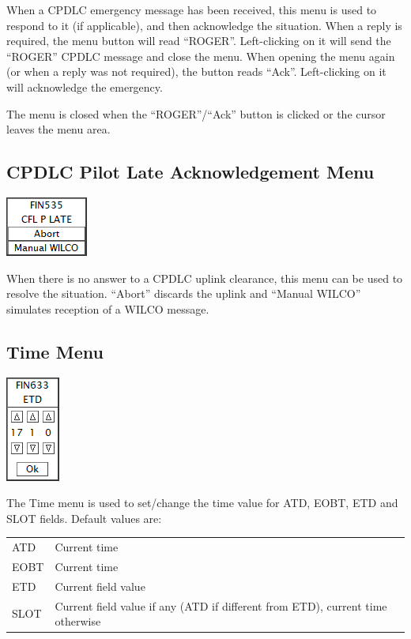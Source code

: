 \documentclass[11pt,a4paper,oldfontcommands]{memoir}
\begin{document}
When a CPDLC emergency message has been received, this menu is used to respond to it (if applicable), and then acknowledge the situation. When a reply is required, the menu button will read “ROGER”. Left-clicking on it will send the “ROGER” CPDLC message and close the menu. When opening the menu again (or when a reply was not required), the button reads “Ack”. Left-clicking on it will acknowledge the emergency. 

The menu is closed when the “ROGER”/“Ack” button is clicked or the cursor leaves the menu area.

\subsection{CPDLC Pilot Late Acknowledgement Menu}
\label{dlplam}
\includegraphics{img/dlplate.png}

When there is no answer to a CPDLC uplink clearance, this menu can be used to resolve the situation. “Abort” discards the uplink and “Manual WILCO” simulates reception of a WILCO message.

\subsection{Time Menu}
\label{time}
\includegraphics{img/etd.png}

The Time menu is used to set/change the time value for ATD, EOBT, ETD and SLOT fields.
Default values are:

\begin{tabular}{l l}
ATD     & Current time\\
EOBT    & Current time\\
ETD     & Current field value\\
SLOT    & Current field value if any (ATD if different from ETD), current time otherwise\\
\end{tabular}
\end{document}

